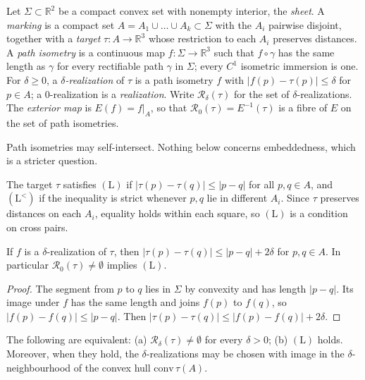 \begin{definition}
\label{def:marking}
Let $\Sigma\subset\mathbb R^2$ be a compact convex set with nonempty interior, the \emph{sheet}. A \emph{marking} is a compact set $A=A_1\cup\dots\cup A_k\subset\Sigma$ with the $A_i$ pairwise disjoint, together with a \emph{target} $\tau:A\to\mathbb R^3$ whose restriction to each $A_i$ preserves distances. A \emph{path isometry} is a continuous map $f:\Sigma\to\mathbb R^3$ such that $f\circ\gamma$ has the same length as $\gamma$ for every rectifiable path $\gamma$ in $\Sigma$; every $C^1$ isometric immersion is one. For $\delta\ge0$, a \emph{$\delta$-realization} of $\tau$ is a path isometry $f$ with $|f(p)-\tau(p)|\le\delta$ for $p\in A$; a $0$-realization is a \emph{realization}. Write $\mathcal R_\delta(\tau)$ for the set of $\delta$-realizations. The \emph{exterior map} is $E(f)=f|_A$, so that $\mathcal R_0(\tau)=E^{-1}(\tau)$ is a fibre of $E$ on the set of path isometries.
\end{definition}

Path isometries may self-intersect. Nothing below concerns embeddedness, which is a stricter question.

\begin{definition}
\label{def:L}
The target $\tau$ satisfies $(\mathrm L)$ if $|\tau(p)-\tau(q)|\le|p-q|$ for all $p,q\in A$, and $(\mathrm L^{<})$ if the inequality is strict whenever $p,q$ lie in different $A_i$. Since $\tau$ preserves distances on each $A_i$, equality holds within each square, so $(\mathrm L)$ is a condition on cross pairs.
\end{definition}

\begin{lemma}[Necessity]
\label{lem:geo-nec}
If $f$ is a $\delta$-realization of $\tau$, then $|\tau(p)-\tau(q)|\le|p-q|+2\delta$ for $p,q\in A$. In particular $\mathcal R_0(\tau)\neq\emptyset$ implies $(\mathrm L)$.
\end{lemma}

\begin{proof}
The segment from $p$ to $q$ lies in $\Sigma$ by convexity and has length $|p-q|$. Its image under $f$ has the same length and joins $f(p)$ to $f(q)$, so $|f(p)-f(q)|\le|p-q|$. Then $|\tau(p)-\tau(q)|\le|f(p)-f(q)|+2\delta$.
\end{proof}

\begin{theorem}
\label{thm:geo-criterion}
The following are equivalent: (a) $\mathcal R_\delta(\tau)\neq\emptyset$ for every $\delta>0$; (b) $(\mathrm L)$ holds. Moreover, when they hold, the $\delta$-realizations may be chosen with image in the $\delta$-neighbourhood of the convex hull $\mathrm{conv}\,\tau(A)$.
\end{theorem}

